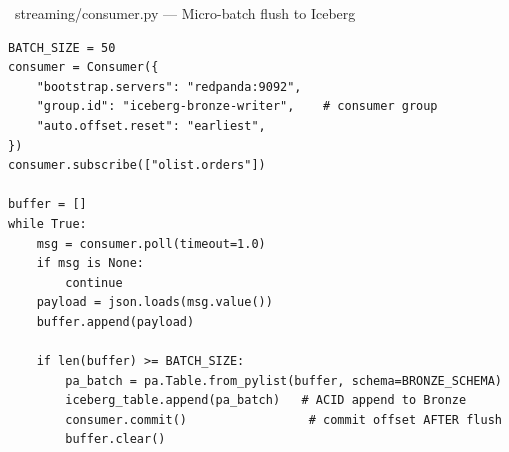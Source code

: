 \documentclass[12pt, a4paper]{article}
\begin{document}
\begin{codebox}{\faCode\ streaming/consumer.py --- Micro-batch flush to Iceberg}
\begin{verbatim}
BATCH_SIZE = 50
consumer = Consumer({
    "bootstrap.servers": "redpanda:9092",
    "group.id": "iceberg-bronze-writer",    # consumer group
    "auto.offset.reset": "earliest",
})
consumer.subscribe(["olist.orders"])

buffer = []
while True:
    msg = consumer.poll(timeout=1.0)
    if msg is None:
        continue
    payload = json.loads(msg.value())
    buffer.append(payload)

    if len(buffer) >= BATCH_SIZE:
        pa_batch = pa.Table.from_pylist(buffer, schema=BRONZE_SCHEMA)
        iceberg_table.append(pa_batch)   # ACID append to Bronze
        consumer.commit()                 # commit offset AFTER flush
        buffer.clear()
\end{verbatim}
\end{codebox}

\vspace{0.5em}
\end{document}
